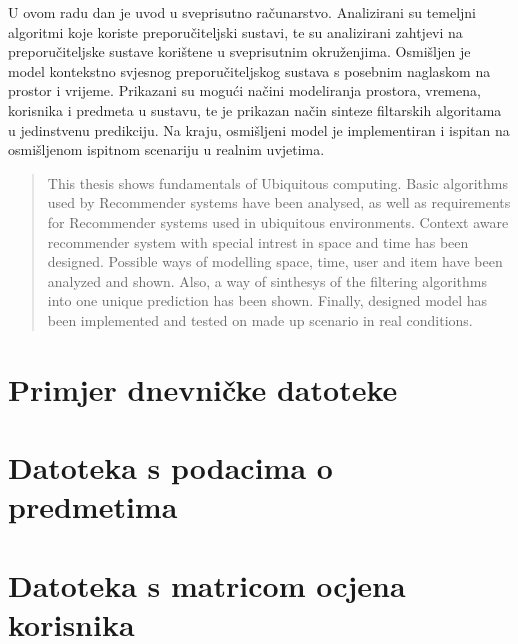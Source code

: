 \documentclass[times, utf8, diplomski, numeric]{fer}
\begin{document}



\begin{sazetak}
U ovom radu dan je uvod u sveprisutno računarstvo. Analizirani su temeljni
algoritmi koje koriste preporučiteljski sustavi, te su analizirani zahtjevi na
preporučiteljske sustave korištene u sveprisutnim okruženjima. Osmišljen je
model kontekstno svjesnog preporučiteljskog sustava s posebnim naglaskom na
prostor i vrijeme. Prikazani su mogući načini modeliranja prostora, vremena,
korisnika i predmeta u sustavu, te je prikazan način sinteze filtarskih
algoritama u jedinstvenu predikciju. Na kraju, osmišljeni model je
implementiran i ispitan na osmišljenom ispitnom scenariju u realnim uvjetima.

\end{sazetak}

\begin{abstract}
This thesis shows fundamentals of Ubiquitous computing. Basic algorithms used by
Recommender systems have been analysed, as well as requirements for Recommender
systems used in ubiquitous environments. Context aware recommender system with
special intrest in space and time has been designed. Possible ways of modelling
space, time, user and item have been analyzed and shown. Also, a way of
sinthesys of the filtering algorithms into one unique prediction has been shown.
Finally, designed model has been implemented and tested on made up scenario in
real conditions.

\end{abstract}

\appendix
\chapter{Primjer dnevničke datoteke}

	
\chapter{Datoteka s podacima o predmetima}


\chapter{Datoteka s matricom ocjena korisnika}

	
\end{document}
